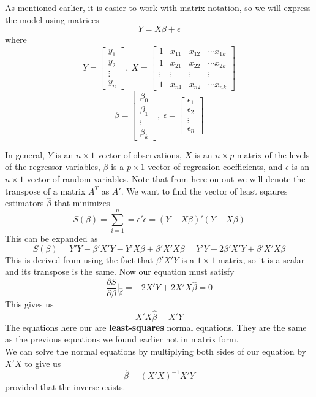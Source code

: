 As mentioned earlier, it is easier to work with matrix notation, so we will express the model using matrices 
\[Y = X\beta + \epsilon\]
where 
\[Y = \begin{bmatrix}
    y_1\\y_2\\\vdots\\y_n
\end{bmatrix}, \ X = \begin{bmatrix}
    1 & x_{11} & x_{12} & \cdots x_{1k}\\
    1 & x_{21} & x_{22} & \cdots x_{2k}\\
    \vdots & \vdots & \vdots & \vdots\\
    1 & x_{n1} & x_{n2} & \cdots x_{nk}
\end{bmatrix}\]
\[\beta = \begin{bmatrix}
    \beta_0 \\ \beta_1 \\ \vdots \\\beta_k
\end{bmatrix}, \ \epsilon = \begin{bmatrix}
    \epsilon_1 \\ \epsilon_2 \\ \vdots \\ \epsilon_n
\end{bmatrix}\]

In general, $Y$ is an $n \times 1$ vector of observations, $X$ is an $n \times p$ matrix of the levels of the regressor variables, $\beta$ is a $p \times 1$ vector of regression coefficients, and $\epsilon$ is an $n \times 1$ vector of random variables. Note that from here on out we will denote the transpose of a matrix $A^T$ as $A'$. We want to find the vector of least sqaures estimators $\hat{\beta}$ that minimizes 
\[S(\beta) = \sum_{i=1}^n = \epsilon'\epsilon = (Y-X\beta)'(Y - X\beta)\]
This can be expanded as 
\[S(\beta) = Y'Y - \beta'X'Y - Y'X\beta + \beta'X'X\beta = Y'Y - 2\beta'X'Y + \beta'X'X\beta\]
This is derived from using the fact that $\beta'X'Y$ is a $1 \times 1$ matrix, so it is a scalar and its transpose is the same. Now our equation must satisfy
\[\frac{\partial S}{\partial \beta}\bigg\vert_{\hat{\beta}} = -2X'Y + 2X'X\hat{\beta} = 0\]
This gives us 
\[X'X\hat{\beta} = X'Y\]
The equations here our are \textbf{least-squares} normal equations. They are the same as the previous equations we found earlier not in matrix form. \\

We can solve the normal equations by multiplying both sides of our equation by $X'X$ to give us 
\[\hat{\beta} = (X'X)^{-1}X'Y\]
provided that the inverse exists. \\

